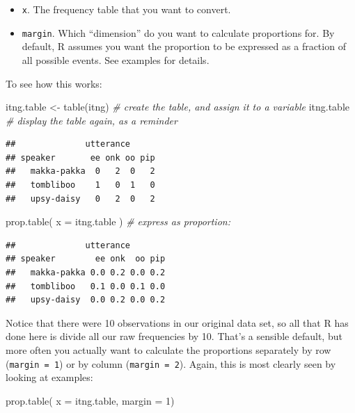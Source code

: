 \documentclass[
]{book}
\newenvironment{Shaded}{\begin{snugshade}}{\end{snugshade}}
\newcommand{\AttributeTok}[1]{\textcolor[rgb]{0.77,0.63,0.00}{#1}}
\newcommand{\CommentTok}[1]{\textcolor[rgb]{0.56,0.35,0.01}{\textit{#1}}}
\newcommand{\DecValTok}[1]{\textcolor[rgb]{0.00,0.00,0.81}{#1}}
\newcommand{\FunctionTok}[1]{\textcolor[rgb]{0.00,0.00,0.00}{#1}}
\newcommand{\NormalTok}[1]{#1}
\newcommand{\OtherTok}[1]{\textcolor[rgb]{0.56,0.35,0.01}{#1}}
\providecommand{\tightlist}{%
  \setlength{\itemsep}{0pt}\setlength{\parskip}{0pt}}
\begin{document}
\begin{itemize}
\tightlist
\item
  \texttt{x}. The frequency table that you want to convert.
\item
  \texttt{margin}. Which ``dimension'' do you want to calculate proportions for. By default, R assumes you want the proportion to be expressed as a fraction of all possible events. See examples for details.
\end{itemize}

To see how this works:

\begin{Shaded}
\begin{Highlighting}[]
\NormalTok{itng.table }\OtherTok{\textless{}{-}} \FunctionTok{table}\NormalTok{(itng)  }\CommentTok{\# create the table, and assign it to a variable}
\NormalTok{itng.table                   }\CommentTok{\# display the table again, as a reminder}
\end{Highlighting}
\end{Shaded}

\begin{verbatim}
##              utterance
## speaker       ee onk oo pip
##   makka-pakka  0   2  0   2
##   tombliboo    1   0  1   0
##   upsy-daisy   0   2  0   2
\end{verbatim}

\begin{Shaded}
\begin{Highlighting}[]
\FunctionTok{prop.table}\NormalTok{( }\AttributeTok{x =}\NormalTok{ itng.table ) }\CommentTok{\# express as proportion:}
\end{Highlighting}
\end{Shaded}

\begin{verbatim}
##              utterance
## speaker        ee onk  oo pip
##   makka-pakka 0.0 0.2 0.0 0.2
##   tombliboo   0.1 0.0 0.1 0.0
##   upsy-daisy  0.0 0.2 0.0 0.2
\end{verbatim}

Notice that there were 10 observations in our original data set, so all that R has done here is divide all our raw frequencies by 10. That's a sensible default, but more often you actually want to calculate the proportions separately by row (\texttt{margin\ =\ 1}) or by column (\texttt{margin\ =\ 2}). Again, this is most clearly seen by looking at examples:

\begin{Shaded}
\begin{Highlighting}[]
\FunctionTok{prop.table}\NormalTok{( }\AttributeTok{x =}\NormalTok{ itng.table, }\AttributeTok{margin =} \DecValTok{1}\NormalTok{)}
\end{Highlighting}
\end{Shaded}
\end{document}
